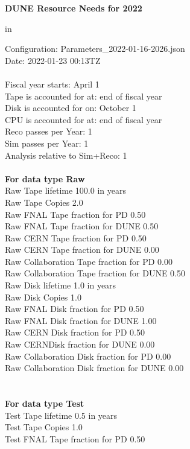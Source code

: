 \documentclass[12pt]{article}
\begin{document}
\centerline{\bf{DUNE Resource Needs for 2022}} in \par Configuration: Parameters\_2022-01-16-2026.json\\
  Date: 2022-01-23 00:13TZ\\
   \\
  
 Fiscal year starts: April 1\\ 
Tape is accounted for at: end of fiscal year\\ 
Disk is accounted for on: October 1\\ 
CPU is accounted for at: end of fiscal year\\ 
Reco passes per Year: 1\\
Sim passes per Year: 1\\
Analysis relative to Sim+Reco: 1\\
\pagebreak
\\
{\bf For data type Raw}\\
   Raw Tape lifetime 100.0 in years\\
   Raw Tape Copies   2.0\\
   Raw FNAL Tape fraction for PD  0.50\\
   Raw FNAL Tape fraction for DUNE  0.50\\
   Raw CERN Tape fraction for PD  0.50\\
   Raw CERN Tape fraction for DUNE  0.00\\
   Raw Collaboration Tape fraction for PD  0.00\\
   Raw Collaboration Tape fraction for DUNE  0.50\\
   Raw Disk lifetime   1.0 in years\\
   Raw Disk Copies   1.0\\
   Raw FNAL Disk fraction for PD  0.50\\
   Raw FNAL Disk fraction for DUNE  1.00\\
   Raw CERN Disk fraction for PD  0.50\\
   Raw CERNDisk fraction for DUNE  0.00\\
   Raw Collaboration Disk fraction for PD  0.00\\
   Raw Collaboration Disk fraction for DUNE  0.00\\
\pagebreak\\
\\
{\bf For data type Test}\\
  Test Tape lifetime   0.5 in years\\
  Test Tape Copies   1.0\\
  Test FNAL Tape fraction for PD  0.50\\
\end{document}
